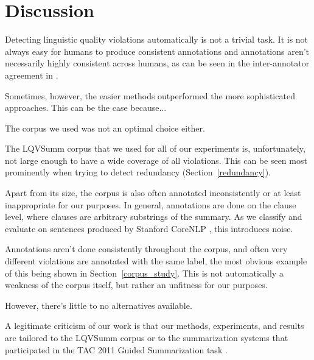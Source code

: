 \documentclass[a4paper,10pt]{scrartcl}
\theoremstyle{style}
\begin{document}
\section{Discussion}
\label{discussion}
Detecting linguistic quality violations automatically is not a trivial task. It is not always easy for humans to produce consistent annotations and annotations aren't necessarily highly consistent across humans, as can be seen in the inter-annotator agreement in \cite{friedrichlqvsumm}.

Sometimes, however, the easier methods outperformed the more sophisticated approaches. This can be the case because...


The corpus we used was not an optimal choice either.

The LQVSumm corpus that we used for all of our experiments is, unfortunately, not large enough to have a wide coverage of all violations. This can be seen most prominently when trying to detect redundancy (Section~\ref{redundancy}).

Apart from its size, the corpus is also often annotated inconsistently or at least inappropriate for our purposes. In general, annotations are done on the clause level, where clauses are arbitrary substrings of the summary. As we classify and evaluate on sentences produced by Stanford CoreNLP \citep{manning-EtAl:2014:P14-5}, this introduces noise.

Annotations aren't done consistently throughout the corpus, and often very different violations are annotated with the same label, the most obvious example of this being shown in Section~\ref{corpus_study}. This is not automatically a weakness of the corpus itself, but rather an unfitness for our purposes.

However, there's little to no alternatives available.

A legitimate criticism of our work is that our methods, experiments, and results are tailored to the LQVSumm corpus or to the summarization systems that participated in the TAC 2011 Guided Summarization task \citep{owczarzak2011overview}.

\end{document}
